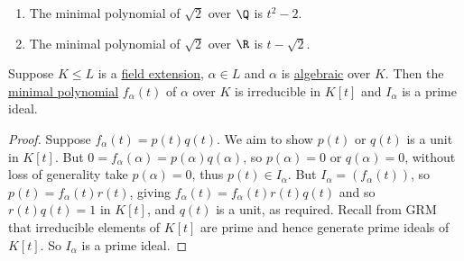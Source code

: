 \documentclass{article}
\begin{document}
\begin{eg}\leavevmode
    \begin{enumerate}[label=(\roman*)]
        \item The minimal polynomial of $\sqrt{2}$ over $\Q$ is $t^2 - 2$.
        \item The minimal polynomial of $\sqrt{2}$ over $\R$ is $t - \sqrt{2}$.
    \end{enumerate}
\end{eg}

\begin{nlemma}\label{lem:1.7}
    Suppose $K \leq L$ is a \hyperlink{def:fieldExt}{field extension}, $\alpha \in L$ and $\alpha$ is \hyperlink{def:algebraic}{algebraic} over $K$.
    Then the \hyperlink{def:minimalPoly}{minimal polynomial} $f_\alpha(t)$ of $\alpha$ over $K$ is irreducible in $K[t]$ and $I_\alpha$ is a prime ideal.
\end{nlemma}

\begin{proof}
    Suppose $f_\alpha(t) = p(t) q(t)$. We aim to show $p(t)$ or $q(t)$ is a unit in $K[t]$.
    But $0 = f_\alpha(\alpha) = p(\alpha) q(\alpha)$, so $p(\alpha) = 0$ or $q(\alpha) = 0$, without loss of generality take $p(\alpha) = 0$, thus $p(t) \in I_\alpha$.
    But $I_\alpha=(f_\alpha(t))$, so $p(t) = f_\alpha(t) r(t)$, giving $f_\alpha(t) = f_\alpha(t) r(t) q(t)$ and so $r(t) q(t) = 1$ in $K[t]$, and $q(t)$ is a unit, as required.
    Recall from GRM that irreducible elements of $K[t]$ are prime and hence generate prime ideals of $K[t]$. So $I_\alpha$ is a prime ideal.
\end{proof}

\end{document}
